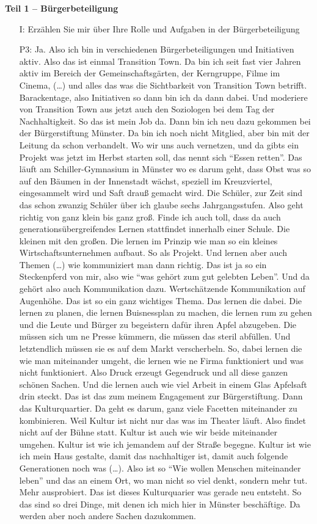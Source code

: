 \textbf{Teil 1 -- B{\"u}rgerbeteiligung}
\begin{itemize}
    \item[I:] Erz{\"a}hlen Sie mir {\"u}ber Ihre Rolle und Aufgaben in der B{\"u}rgerbeteiligung
    \item[P3:] Ja. Also ich bin in verschiedenen B{\"u}rgerbeteiligungen und Initiativen aktiv. Also das ist einmal Transition Town. Da bin ich seit fast vier Jahren aktiv im Bereich der Gemeinschaftsg{\"a}rten, der Kerngruppe, Filme im Cinema, (\dots) und alles das was die Sichtbarkeit von Transition Town betrifft. Barackentage, also Initiativen so dann bin ich da dann dabei. Und moderiere von Transition Town aus jetzt auch den Soziologen bei dem Tag der Nachhaltigkeit. So das ist mein Job da. Dann bin ich neu dazu gekommen bei der B{\"u}rgerstiftung M{\"u}nster. Da bin ich noch nicht Mitglied, aber bin mit der Leitung da schon verbandelt. Wo wir uns auch vernetzen, und da gibts ein Projekt was jetzt im Herbst starten soll, das nennt sich "`Essen retten"'. Das l{\"a}uft am Schiller-Gymnasium in M{\"u}nster wo es darum geht, dass Obst was so auf den B{\"a}umen in der Innenstadt w{\"a}chst, speziell im Kreuzviertel, eingesammelt wird und Saft drau{\ss} gemacht wird. Die Sch{\"u}ler, zur Zeit sind das schon zwanzig Sch{\"u}ler {\"u}ber ich glaube sechs Jahrgangsstufen. Also geht richtig von ganz klein bis ganz gro{\ss}. Finde ich auch toll, dass da auch generations{\"u}bergreifendes Lernen stattfindet innerhalb einer Schule. Die kleinen mit den gro{\ss}en. Die lernen im Prinzip wie man so ein kleines Wirtschaftsunternehmen aufbaut. So als Projekt. Und lernen aber auch Themen (\dots) wie kommuniziert man dann richtig. Das ist ja so ein Steckenpferd von mir, also wie "`was geh{\"o}rt zum gut gelebten Leben"'. Und da geh{\"o}rt also auch Kommunikation dazu. Wertsch{\"a}tzende Kommunikation auf Augenh{\"o}he. Das ist so ein ganz wichtiges Thema. Das lernen die dabei. Die lernen zu planen, die lernen Buisnessplan zu machen, die lernen rum zu gehen und die Leute und B{\"u}rger zu begeistern daf{\"u}r ihren Apfel abzugeben. Die m{\"u}ssen sich um ne Presse k{\"u}mmern, die m{\"u}ssen das steril abf{\"u}llen. Und letztendlich m{\"u}ssen sie es auf dem Markt verscherbeln. So, dabei lernen die wie man miteinander umgeht, die lernen wie ne Firma funktioniert und was nicht funktioniert. Also Druck erzeugt Gegendruck und all diese ganzen sch{\"o}nen Sachen. Und die lernen auch wie viel Arbeit in einem Glas Apfelsaft drin steckt. Das ist das zum meinem Engagement zur B{\"u}rgerstiftung. Dann das Kulturquartier. Da geht es darum, ganz viele Facetten miteinander zu kombinieren. Weil Kultur ist nicht nur das was im Theater l{\"a}uft. Also findet nicht auf der B{\"u}hne statt. Kultur ist auch wie wir beide miteinander umgehen. Kultur ist wie ich jemandem auf der Stra{\ss}e begegne. Kultur ist wie ich mein Haus gestalte, damit das nachhaltiger ist, damit auch folgende Generationen noch was (\dots). Also ist so "`Wie wollen Menschen miteinander leben"' und das an einem Ort, wo man nicht so viel denkt, sondern mehr tut. Mehr ausprobiert. Das ist dieses Kulturquarier was gerade neu entsteht. So das sind so drei Dinge, mit denen ich mich hier in M{\"u}nster besch{\"a}ftige. Da werden aber noch andere Sachen dazukommen. 
\end{itemize}
